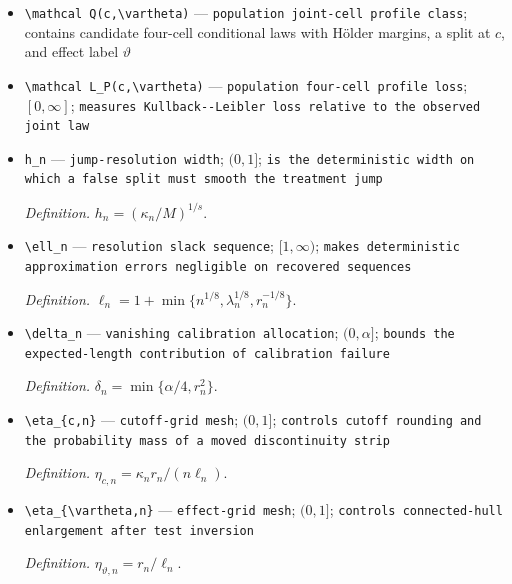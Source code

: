 \documentclass{article}
\begin{document}
\begin{itemize}
  \item \texttt{\textbackslash{}\allowbreak{}mathcal Q(c,\allowbreak{}\textbackslash{}\allowbreak{}vartheta)} --- \texttt{population joint-\allowbreak{}cell profile class}; contains candidate four-cell conditional laws with H\"older margins, a split at \(c\), and effect label \(\vartheta\)
  \item \texttt{\textbackslash{}\allowbreak{}mathcal L\_\allowbreak{}P(c,\allowbreak{}\textbackslash{}\allowbreak{}vartheta)} --- \texttt{population four-\allowbreak{}cell profile loss}; \([0,\infty]\); \texttt{measures Kullback-\allowbreak{}-\allowbreak{}Leibler loss relative to the observed joint law}
  \item \texttt{h\_\allowbreak{}n} --- \texttt{jump-\allowbreak{}resolution width}; \((0,1]\); \texttt{is the deterministic width on which a false split must smooth the treatment jump}
  \par\smallskip\noindent\emph{Definition.} \(h_n=(\kappa_n/M)^{1/s}\).
  \item \texttt{\textbackslash{}\allowbreak{}ell\_\allowbreak{}n} --- \texttt{resolution slack sequence}; \([1,\infty)\); \texttt{makes deterministic approximation errors negligible on recovered sequences}
  \par\smallskip\noindent\emph{Definition.} \(\ell_n=1+\min\{n^{1/8},\lambda_n^{1/8},r_n^{-1/8}\}\).
  \item \texttt{\textbackslash{}\allowbreak{}delta\_\allowbreak{}n} --- \texttt{vanishing calibration allocation}; \((0,\alpha]\); \texttt{bounds the expected-\allowbreak{}length contribution of calibration failure}
  \par\smallskip\noindent\emph{Definition.} \(\delta_n=\min\{\alpha/4,r_n^2\}\).
  \item \texttt{\textbackslash{}\allowbreak{}eta\_\allowbreak{}\{c,\allowbreak{}n\}\allowbreak{}} --- \texttt{cutoff-\allowbreak{}grid mesh}; \((0,1]\); \texttt{controls cutoff rounding and the probability mass of a moved discontinuity strip}
  \par\smallskip\noindent\emph{Definition.} \(\eta_{c,n}=\kappa_n r_n/(n\ell_n)\).
  \item \texttt{\textbackslash{}\allowbreak{}eta\_\allowbreak{}\{\textbackslash{}\allowbreak{}vartheta,\allowbreak{}n\}\allowbreak{}} --- \texttt{effect-\allowbreak{}grid mesh}; \((0,1]\); \texttt{controls connected-\allowbreak{}hull enlargement after test inversion}
  \par\smallskip\noindent\emph{Definition.} \(\eta_{\vartheta,n}=r_n/\ell_n\).

\end{itemize}
\end{document}
